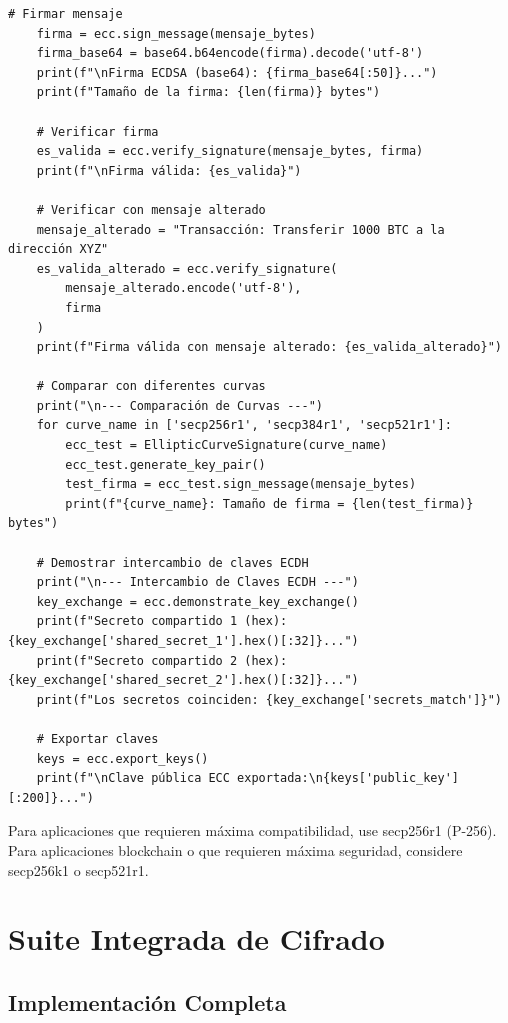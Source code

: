 \documentclass[12pt,a4paper]{article}
\begin{document}
\begin{lstlisting}[caption=Implementación de firma digital con curvas elípticas]
    # Firmar mensaje
    firma = ecc.sign_message(mensaje_bytes)
    firma_base64 = base64.b64encode(firma).decode('utf-8')
    print(f"\nFirma ECDSA (base64): {firma_base64[:50]}...")
    print(f"Tamaño de la firma: {len(firma)} bytes")
    
    # Verificar firma
    es_valida = ecc.verify_signature(mensaje_bytes, firma)
    print(f"\nFirma válida: {es_valida}")
    
    # Verificar con mensaje alterado
    mensaje_alterado = "Transacción: Transferir 1000 BTC a la dirección XYZ"
    es_valida_alterado = ecc.verify_signature(
        mensaje_alterado.encode('utf-8'), 
        firma
    )
    print(f"Firma válida con mensaje alterado: {es_valida_alterado}")
    
    # Comparar con diferentes curvas
    print("\n--- Comparación de Curvas ---")
    for curve_name in ['secp256r1', 'secp384r1', 'secp521r1']:
        ecc_test = EllipticCurveSignature(curve_name)
        ecc_test.generate_key_pair()
        test_firma = ecc_test.sign_message(mensaje_bytes)
        print(f"{curve_name}: Tamaño de firma = {len(test_firma)} bytes")
    
    # Demostrar intercambio de claves ECDH
    print("\n--- Intercambio de Claves ECDH ---")
    key_exchange = ecc.demonstrate_key_exchange()
    print(f"Secreto compartido 1 (hex): {key_exchange['shared_secret_1'].hex()[:32]}...")
    print(f"Secreto compartido 2 (hex): {key_exchange['shared_secret_2'].hex()[:32]}...")
    print(f"Los secretos coinciden: {key_exchange['secrets_match']}")
    
    # Exportar claves
    keys = ecc.export_keys()
    print(f"\nClave pública ECC exportada:\n{keys['public_key'][:200]}...")
\end{lstlisting}

\begin{securitygoodpractice}
	Para aplicaciones que requieren máxima compatibilidad, use secp256r1 (P-256). Para aplicaciones blockchain o que requieren máxima seguridad, considere secp256k1 o secp521r1.
\end{securitygoodpractice}

\newpage

\section{Suite Integrada de Cifrado}

\subsection{Implementación Completa}
\end{document}
